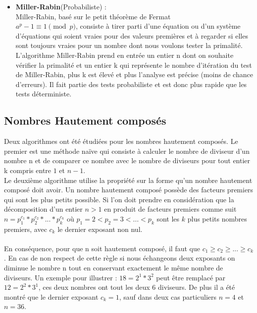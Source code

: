 \begin{itemize}
			\item \textbf{Miller-Rabin}\cite{millerrabin}(Probabiliste) :\\
			Miller-Rabin, basé sur le petit théorème de Fermat \\ $a^p-1 \equiv 1 \pmod p$, consiste à tirer parti d'une équation ou d'un système d'équations qui soient vraies pour des valeurs premières et à regarder si elles sont toujours vraies pour un nombre dont nous voulons tester la primalité. L'algorithme Miller-Rabin prend en entrée un entier n dont on souhaite vérifier la primalité et un entier k qui représente le nombre d’itération du test de Miller-Rabin, plus k est élevé et plus l’analyse est précise (moins de chance d’erreurs). Il fait partie des tests probabiliste et est donc plus rapide que les tests déterministe.\\
		\end{itemize}
		
		\subsection{Nombres Hautement composés}
		Deux algorithmes ont été étudiées pour les nombres hautement composés\cite{highlycomposed}. 
		Le premier est une méthode naïve qui consiste à calculer le nombre de diviseur d'un nombre n et de comparer ce nombre avec le nombre de diviseurs pour tout entier k compris entre $1$ et $n-1$.\\
		Le deuxième algorithme utilise la propriété sur la forme qu'un nombre hautement composé doit avoir. Un nombre hautement composé possède des facteurs premiers qui sont les plus petits possible. Si l'on doit prendre en considération que la décomposition d'un entier $n > 1$ en produit de facteurs premiers comme suit  $n = p_1^{c_1} * p_2^{c_2} * ... * p_k^{c_k}$ où $p_1 = 2 < p_2 = 3 < … < p_k$ sont les $k$ plus petits nombres premiers, avec $c_k$ le dernier exposant non nul.
		\paragraph{}En conséquence, pour que n soit hautement composé, il faut que $c_1 \ge c_2 \ge ... \ge c_k$. En cas de non respect de cette règle si nous échangeons deux exposants on diminue le nombre n tout en conservant exactement le même nombre de diviseurs. Un exemple pour illustrer : $18 = 2^1 * 3^2$ peut être remplacé par $12 = 2^2 * 3^1$, ces deux nombres ont tout les deux 6 diviseurs. De plus il a été montré que le dernier exposant $c_k = 1$, sauf dans deux cas particuliers $n = 4$ et $n = 36$.

